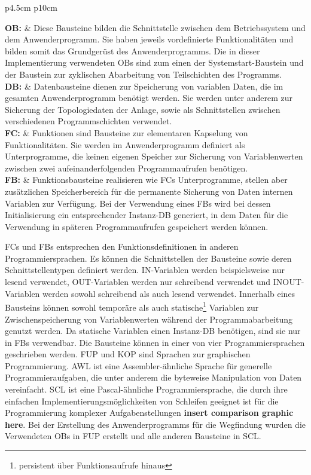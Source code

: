 			\begin{tabular}{{p{4.5cm} p{10cm}}}
				
				\textbf{\ac{OB}:} & Diese Bausteine bilden die Schnittstelle zwischen dem Betriebssystem und dem Anwenderprogramm. Sie haben jeweils vordefinierte Funktionalitäten und bilden somit das Grundgerüst des Anwenderprogramms. Die in dieser Implementierung verwendeten \ac{OB}s sind zum einen der Systemstart-Baustein und der Baustein zur zyklischen Abarbeitung von Teilschichten des Programms.\\[0.5cm]
				\textbf{\ac{DB}:} & Datenbausteine dienen zur Speicherung von variablen Daten, die im gesamten Anwenderprogramm benötigt werden. Sie werden unter anderem zur Sicherung der Topologiedaten der Anlage, sowie als Schnittstellen zwischen verschiedenen Programmschichten verwendet.\\[0.5cm]
				\textbf{\ac{FC}:} & Funktionen sind Bausteine zur elementaren Kapselung von Funktionalitäten. Sie werden im Anwenderprogramm definiert als Unterprogramme, die keinen eigenen Speicher zur Sicherung von Variablenwerten zwischen zwei aufeinanderfolgenden Programmaufrufen benötigen.\\[0.5cm]
				\textbf{\ac{FB}:} & Funktionsbausteine realisieren wie \ac{FC}s Unterprogramme, stellen aber zusätzlichen Speicherbereich für die permanente Sicherung von Daten internen Variablen zur Verfügung. Bei der Verwendung eines \ac{FB}s wird bei dessen Initialisierung ein entsprechender Instanz-\ac{DB} generiert, in dem Daten für die Verwendung in späteren Programmaufrufen gespeichert werden können.\\[0.5cm]
				
			\end{tabular}
			
			\ac{FC}s und \ac{FB}s entsprechen den Funktionsdefinitionen in anderen Programmiersprachen. Es können die Schnittstellen der Bausteine sowie deren Schnittstellentypen definiert werden. IN-Variablen werden beispielsweise nur lesend verwendet, OUT-Variablen werden nur schreibend verwendet und INOUT-Variablen werden sowohl schreibend als auch lesend verwendet. Innerhalb eines Bausteins können sowohl temporäre als auch statische\footnote{persistent über Funktionsaufrufe hinaus} Variablen zur Zwischenspeicherung von Variablenwerten während der Programmabarbeitung genutzt werden. Da statische Variablen einen Instanz-\ac{DB} benötigen, sind sie nur in \ac{FB}s verwendbar.
			Die Bausteine können in einer von vier Programmiersprachen geschrieben werden. \ac{FUP} und \ac{KOP} sind Sprachen zur graphischen Programmierung. \ac{AWL} ist eine Assembler-ähnliche Sprache für generelle Programmieraufgaben, die unter anderem die byteweise Manipulation von Daten vereinfacht. \ac{SCL} ist eine Pascal-ähnliche Programmiersprache, die durch ihre einfachen Implementierungsmöglichkeiten von Schleifen geeignet ist für die Programmierung komplexer Aufgabenstellungen \textbf{insert comparison graphic here}. Bei der Erstellung des Anwenderprogramms für die Wegfindung wurden die Verwendeten \ac{OB}s in \ac{FUP} erstellt und alle anderen Bausteine in SCL.
			

